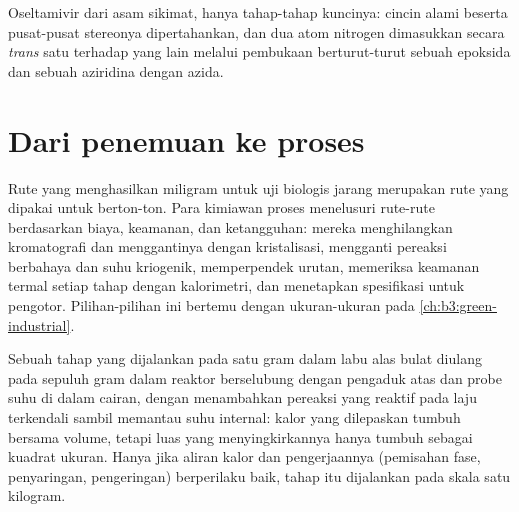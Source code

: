 \begin{omfigure}

{\small Oseltamivir dari asam sikimat, hanya tahap-tahap kuncinya: cincin alami beserta
pusat-pusat stereonya dipertahankan, dan dua atom nitrogen dimasukkan secara \textit{trans} satu terhadap yang lain
melalui pembukaan berturut-turut sebuah epoksida dan sebuah aziridina dengan azida.}
\end{omfigure}

\section{Dari penemuan ke proses}

Rute yang menghasilkan miligram untuk uji biologis jarang merupakan rute yang dipakai
untuk berton-ton. Para kimiawan proses menelusuri rute-rute berdasarkan biaya, keamanan, dan ketangguhan:
mereka menghilangkan kromatografi dan menggantinya dengan kristalisasi, mengganti pereaksi
berbahaya dan suhu kriogenik, memperpendek urutan, memeriksa keamanan termal
setiap tahap dengan kalorimetri, dan menetapkan spesifikasi untuk pengotor.
Pilihan-pilihan ini bertemu dengan ukuran-ukuran pada \cref{ch:b3:green-industrial}.

\begin{inthelab}
Sebuah tahap yang dijalankan pada satu gram dalam labu alas bulat diulang pada sepuluh gram dalam
reaktor berselubung dengan pengaduk atas dan probe suhu di dalam
cairan, dengan menambahkan pereaksi yang reaktif pada laju terkendali sambil memantau
suhu internal: kalor yang dilepaskan tumbuh bersama volume, tetapi luas yang
menyingkirkannya hanya tumbuh sebagai kuadrat ukuran. Hanya jika aliran kalor dan pengerjaannya
(pemisahan fase, penyaringan, pengeringan) berperilaku baik, tahap itu dijalankan pada skala satu kilogram.
\end{inthelab}

